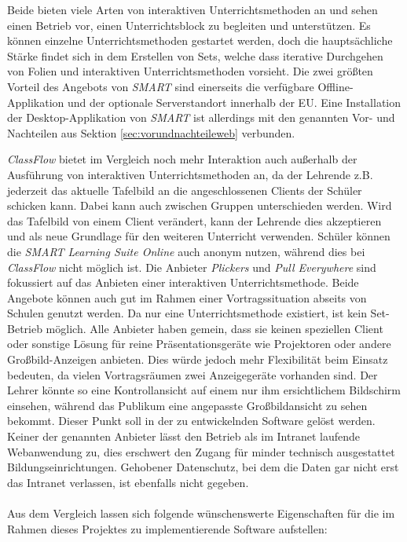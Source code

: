 Beide bieten viele Arten von interaktiven Unterrichtsmethoden an und sehen einen Betrieb vor, einen Unterrichtsblock zu begleiten und unterstützen. Es können einzelne Unterrichtsmethoden gestartet werden, doch die hauptsächliche Stärke findet sich in dem Erstellen von Sets, welche dass iterative Durchgehen von Folien und interaktiven Unterrichtsmethoden vorsieht. Die zwei größten Vorteil des Angebots von \emph{SMART} sind einerseits die verfügbare Offline-Applikation und der optionale Serverstandort innerhalb der EU.
Eine Installation der Desktop-Applikation von \emph{SMART} ist allerdings mit den genannten Vor- und Nachteilen aus Sektion \ref{sec:vorundnachteileweb} verbunden. 

\emph{ClassFlow} bietet im Vergleich noch mehr Interaktion auch außerhalb der Ausführung von interaktiven Unterrichtsmethoden an, da der Lehrende z.B. jederzeit das aktuelle Tafelbild an die angeschlossenen Clients der Schüler schicken kann. Dabei kann auch zwischen Gruppen unterschieden werden. Wird das Tafelbild von einem Client verändert, kann der Lehrende dies akzeptieren und als neue Grundlage für den weiteren Unterricht verwenden. Schüler können die \emph{SMART Learning Suite Online} auch anonym nutzen, während dies bei \emph{ClassFlow} nicht möglich ist. Die Anbieter \emph{Plickers} und \emph{Pull Everywhere} sind fokussiert auf das Anbieten einer interaktiven Unterrichtsmethode. Beide Angebote können auch gut im Rahmen einer Vortragssituation abseits von Schulen genutzt werden. Da nur eine Unterrichtsmethode existiert, ist kein Set-Betrieb möglich. Alle Anbieter haben gemein, dass sie keinen speziellen Client oder sonstige Lösung für reine Präsentationsgeräte wie Projektoren oder andere Großbild-Anzeigen anbieten. Dies würde jedoch mehr Flexibilität beim Einsatz bedeuten, da vielen Vortragsräumen zwei Anzeigegeräte vorhanden sind. Der Lehrer könnte so eine Kontrollansicht auf einem nur ihm ersichtlichem Bildschirm einsehen, während das Publikum eine angepasste Großbildansicht zu sehen bekommt. Dieser Punkt soll in der zu entwickelnden Software gelöst werden. Keiner der genannten Anbieter lässt den Betrieb als im Intranet laufende Webanwendung zu, dies erschwert den Zugang für minder technisch ausgestattet Bildungseinrichtungen. Gehobener Datenschutz, bei dem die Daten gar nicht erst das Intranet verlassen, ist ebenfalls nicht gegeben. \\ \\
Aus dem Vergleich lassen sich folgende wünschenswerte Eigenschaften für die im Rahmen dieses Projektes zu implementierende Software aufstellen:
